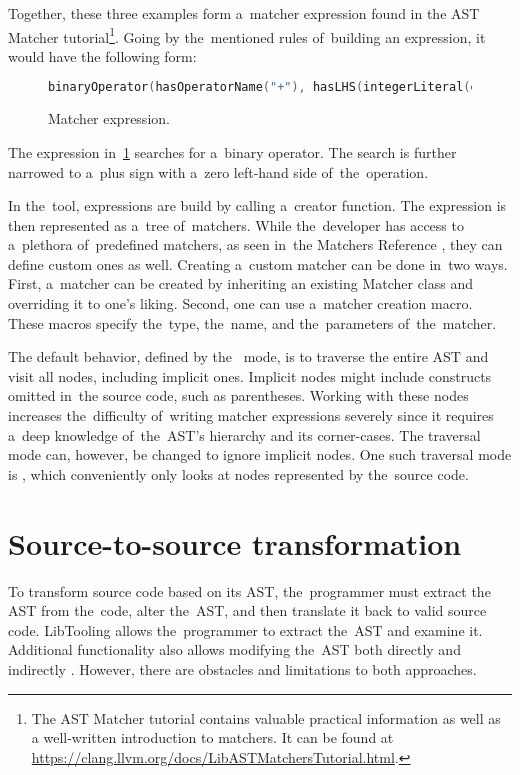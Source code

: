 Together, these three examples form a~matcher expression found in
the AST Matcher tutorial\footnote{The AST Matcher tutorial contains 
valuable practical information as well as a well-written introduction
to matchers. It can be found at 
\url{https://clang.llvm.org/docs/LibASTMatchersTutorial.html}.}. 
Going by the~mentioned rules of~building an expression, it would have 
the following form: 

\begin{figure}
\begin{lstlisting}[language=C++, numbers=none]
binaryOperator(hasOperatorName("+"), hasLHS(integerLiteral(equals(0)))).
\end{lstlisting}
\caption{Matcher expression.}
\label{lst:matcherexpr}
\end{figure}

The expression in~\ref{lst:matcherexpr} searches for a~binary operator. 
The search is further narrowed to a~plus sign with a~zero left-hand 
side of~the~operation.

In the~tool, expressions are build by calling a~creator function. 
The expression is then represented as a~tree of~matchers. 
While the~developer has access to a~plethora of~predefined matchers, 
as seen in~the Matchers Reference \citep{matchersreference:online}, 
they can define custom ones as well. 
Creating a~custom matcher can be done in~two ways. 
First, a~matcher can be created by inheriting an existing Matcher class 
and overriding it to one's liking. 
Second, one can use a~matcher creation macro. 
These macros specify the~type, the~name, and the~parameters of~the~matcher.

The default behavior, defined by the~ mode, is to traverse 
the entire AST and visit all nodes, including implicit ones. 
Implicit nodes might include constructs omitted in~the source code, 
such as parentheses. 
Working with these nodes increases the~difficulty of~writing matcher 
expressions severely since it requires a~deep knowledge of~the~AST's 
hierarchy and its corner-cases. 
The traversal mode can, however, be changed to ignore implicit nodes. 
One such traversal mode is , 
which conveniently only looks at nodes represented by the~source code. 

\section{Source-to-source transformation}

To transform source code based on its AST, the~programmer must extract 
the AST from the~code, alter the~AST, and then translate it back to valid 
source code. 
LibTooling allows the~programmer to extract the~AST and examine it. 
Additional functionality also allows modifying the~AST both directly 
and indirectly \citep{sourcetosource:online}. 
However, there are obstacles and limitations to both approaches. 

